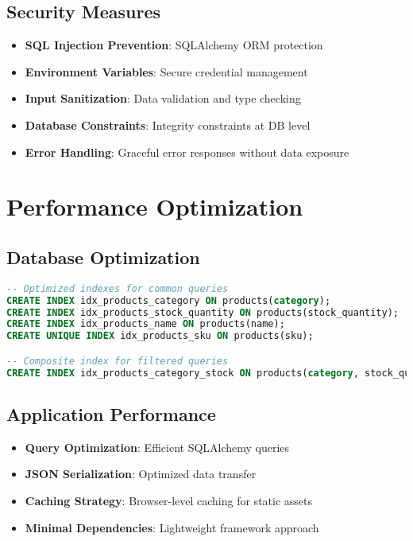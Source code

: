 \documentclass[12pt,a4paper]{article}
\begin{document}
\subsection{Security Measures}

\begin{itemize}
    \item \textbf{SQL Injection Prevention}: SQLAlchemy ORM protection
    \item \textbf{Environment Variables}: Secure credential management
    \item \textbf{Input Sanitization}: Data validation and type checking
    \item \textbf{Database Constraints}: Integrity constraints at DB level
    \item \textbf{Error Handling}: Graceful error responses without data exposure
\end{itemize}

\section{Performance Optimization}

\subsection{Database Optimization}

\begin{lstlisting}[language=SQL, caption=Performance Indexes]
-- Optimized indexes for common queries
CREATE INDEX idx_products_category ON products(category);
CREATE INDEX idx_products_stock_quantity ON products(stock_quantity);
CREATE INDEX idx_products_name ON products(name);
CREATE UNIQUE INDEX idx_products_sku ON products(sku);

-- Composite index for filtered queries
CREATE INDEX idx_products_category_stock ON products(category, stock_quantity);
\end{lstlisting}

\subsection{Application Performance}

\begin{itemize}
    \item \textbf{Query Optimization}: Efficient SQLAlchemy queries
    \item \textbf{JSON Serialization}: Optimized data transfer
    \item \textbf{Caching Strategy}: Browser-level caching for static assets
    \item \textbf{Minimal Dependencies}: Lightweight framework approach
\end{itemize}
\end{document}
